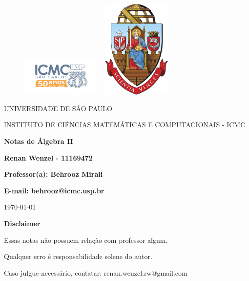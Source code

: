 \documentclass{article}
\begin{document}
\begin{figure}[ht]
  \includegraphics[width=4cm]{icmc.png}
  \hspace{7cm}
  \includegraphics[height=4.9cm,width=4cm]{brasao_usp_cor.jpg}
  \endminipage  
\end{figure}

\begin{center}
  \vspace{1cm}
  \LARGE
  UNIVERSIDADE DE S\~AO PAULO

  \vspace{1.3cm}
  \LARGE
  INSTITUTO DE CI\^ENCIAS MATEM\'ATICAS E COMPUTACIONAIS - ICMC

  \vspace{1.7cm}
  \Large
  \textbf{Notas de Álgebra II}

  \vspace{1.3cm}
  \large
  \textbf{Renan Wenzel - 11169472}

  \vspace{1.3cm}
  \large
  \textbf{Professor(a): Behrooz Miraii}

  \textbf{E-mail: behrooz@icmc.usp.br}

  \vspace{1.3cm}
  \today
\end{center}

\newpage
\textbf{{\Huge Disclaimer}}
\vspace{5cm}

{\huge Essas notas não possuem relação com professor algum. 

  Qualquer erro é responsabilidade solene do autor.

Caso julgue necessário, contatar: renan.wenzel.rw@gmail.com}
\tableofcontents

\newpage
\end{document}
